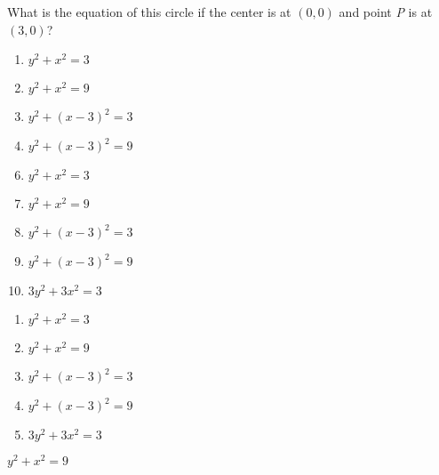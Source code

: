 What is the equation of this circle if the center is at $(0,0)$ and point \textit{P} is at $(3,0)$?


\ifsat
	\begin{enumerate}[label=\Alph*)]
		\item   $\textit{y}^2+\textit{x}^2=3$
		\item  $\textit{y}^2+\textit{x}^2=9$ %
		\item  $\textit{y}^2+(\textit{x}-3)^2=3$ 
		\item  $\textit{y}^2+(\textit{x}-3)^2=9$ 
	\end{enumerate}
\else
\fi

\ifacteven
	\begin{enumerate}[label=\textbf{\Alph*.},itemsep=\fill,align=left]
		\setcounter{enumii}{5}
		\item   $\textit{y}^2+\textit{x}^2=3$
		\item  $\textit{y}^2+\textit{x}^2=9$ %
		\item  $\textit{y}^2+(\textit{x}-3)^2=3$ 
		\addtocounter{enumii}{1}
		\item  $\textit{y}^2+(\textit{x}-3)^2=9$ 
		\item  $3\textit{y}^2+3\textit{x}^2=3$ 
	\end{enumerate}
\else
\fi

\ifactodd
	\begin{enumerate}[label=\textbf{\Alph*.},itemsep=\fill,align=left]
		\item   $\textit{y}^2+\textit{x}^2=3$
		\item  $\textit{y}^2+\textit{x}^2=9$ %
		\item  $\textit{y}^2+(\textit{x}-3)^2=3$ 
		\item  $\textit{y}^2+(\textit{x}-3)^2=9$ 
		\item  $3\textit{y}^2+3\textit{x}^2=3$ 
	\end{enumerate}
\else
\fi

\ifgridin
  $\textit{y}^2+\textit{x}^2=9$ %
		
\else
\fi

